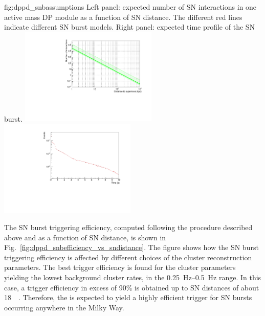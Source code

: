 \begin{dunefigure}{fig:dppd_snbassumptions}
     {Left panel: expected number of SN \nue {} interactions in one \dpactivelarmass active mass DP module as a function of SN distance. The different red lines indicate different SN burst models. Right panel: expected time profile of the SN burst.}
    \includegraphics[width=0.49\textwidth]{graphics/dppd_events_vs_sndistance.pdf} \hfill
    \includegraphics[width=0.49\textwidth]{graphics/dppd_sntime_profile.pdf} 
    \end{dunefigure}

The SN burst triggering efficiency, computed following the procedure described above and as a function of SN distance, is shown in Fig.~\ref{fig:dppd_snbefficiency_vs_sndistance}. The figure shows how the SN burst triggering efficiency is affected by different choices of the cluster reconstruction parameters. The best trigger efficiency is found for the cluster parameters yielding the lowest background cluster rates, in the \SIrange{0.25}{0.5}{\Hz} range. In this case, a trigger efficiency in excess of \num{90}\% is obtained up to SN distances of about \SI{18}{\kilo\parsec}. Therefore, the  is expected to yield a highly efficient trigger for SN bursts occurring anywhere in the Milky Way.

